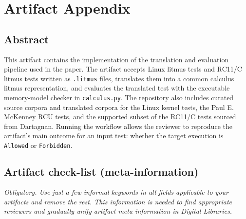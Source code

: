 \documentclass{sigplanconf}
\begin{document}


\appendix
\section{Artifact Appendix}

\subsection{Abstract}

This artifact contains the implementation of the translation and evaluation
pipeline used in the paper.  The artifact accepts Linux litmus tests and
RC11/C litmus tests written as \texttt{.litmus} files, translates them into a
common calculus litmus representation, and evaluates the translated test with
the executable memory-model checker in \texttt{calculus.py}.  The repository
also includes curated source corpora and translated corpora for the
Linux kernel tests, the Paul E. McKenney RCU tests, and the supported subset
of the RC11/C tests sourced from Dartagnan.  Running the workflow allows the reviewer to reproduce the
artifact's main outcome for an input test: whether the target execution is
\texttt{Allowed} or \texttt{Forbidden}.

\subsection{Artifact check-list (meta-information)}

{\em Obligatory. Use just a few informal keywords in all fields applicable to your artifacts
and remove the rest. This information is needed to find appropriate reviewers and gradually 
unify artifact meta information in Digital Libraries.}
\end{document}
